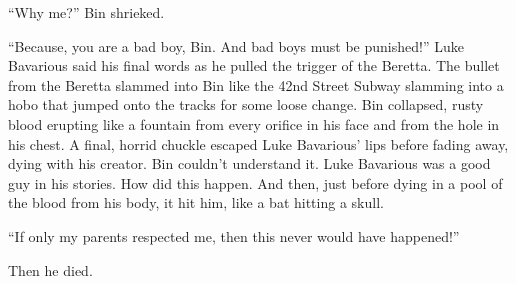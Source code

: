 ``Why me?'' Bin shrieked.

``Because, you are a bad boy, Bin. And bad boys must be
punished!'' Luke Bavarious said his final words as he pulled
the trigger of the Beretta. The bullet from the Beretta slammed
into Bin like the 42nd Street Subway slamming into a hobo that
jumped onto the tracks for some loose change. Bin collapsed, rusty
blood erupting like a fountain from every orifice in his face and
from the hole in his chest. A final, horrid chuckle escaped Luke
Bavarious' lips before fading away, dying with his creator.
Bin couldn't understand it. Luke Bavarious was a good guy in
his stories. How did this happen. And then, just before dying in a
pool of the blood from his body, it hit him, like a bat hitting a
skull.

``If only my parents respected me, then this never would have
happened!''

Then he died. 
 



